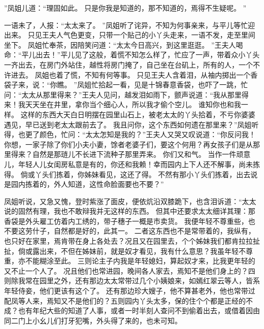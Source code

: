 ”凤姐儿道：“理固如此。
只是你我是知道的，那不知道的，焉得不生疑呢。
”\par
一语未了，人报：“太太来了。
”凤姐听了诧异，不知为何事亲来，与平儿等忙迎出来。
只见王夫人气色更变，只带一个贴己的小丫头走来，一语不发，走至里间坐下。
凤姐忙奉茶，因陪笑问道：“太太今日高兴，到这里逛逛。
”王夫人喝命：“平儿出去！”平儿见了这般，着慌不知怎么样了，忙应了一声，带着众小丫头一齐出去，在房门外站住，越性将房门掩了，自己坐在台矶上，所有的人，一个不许进去。
凤姐也着了慌，不知有何等事。
只见王夫人含着泪，从袖内掷出一个香袋子来，说：“你瞧。
”凤姐忙拾起一看，见是十锦春意香袋，也吓了一跳，忙问：“太太从那里得来？”王夫人见问，越发泪如雨下，颤声说道：“我从那里得来！我天天坐在井里，拿你当个细心人，所以我才偷个空儿。
谁知你也和我一样。
这样的东西大天白日明摆在园里山石上，被老太太的丫头拾着，不亏你婆婆遇见，早已送到老太太跟前去了。
我且问你，这个东西如何遗在那里来？”凤姐听得，也更了颜色，忙问：“太太怎知是我的？”王夫人又哭又叹说道：“你反问我！你想，一家子除了你们小夫小妻，馀者老婆子们，要这个何用？再女孩子们是从那里得来？自然是那琏儿不长进下流种子那里弄来。
你们又和气。
当作一件顽意儿，年轻人儿女闺房私意是有的，你还和我赖！幸而园内上下人还不解事，尚未拣得。
倘或丫头们拣着，你姊妹看见，这还了得。
不然有那小丫头们拣着，出去说是园内拣着的，外人知道，这性命脸面要也不要？”\par
凤姐听说，又急又愧，登时紫涨了面皮，便依炕沿双膝跪下，也含泪诉道：“太太说的固然有理，我也不敢辩我并无这样的东西。
但其中还要求太太细详其理：那香袋是外头雇工仿着内工绣的，带子穗子一概是市卖货。
我便年轻不尊重些，也不要这劳什子，自然都是好的，此其一。
二者这东西也不是常带着的，我纵有，也只好在家里，焉肯带在身上各处去？况且又在园里去，个个姊妹我们都肯拉拉扯扯，倘或露出来，不但在姊妹前，就是奴才看见，我有什么意思？我虽年轻不尊重，亦不能糊涂至此。
三则论主子内我是年轻媳妇，算起奴才来，比我更年轻的又不止一个人了。
况且他们也常进园，晚间各人家去，焉知不是他们身上的？四则除我常在园里之外，还有那边太太常带过几个小姨娘来，如嫣红翠云等人，皆系年轻侍妾，他们更该有这个了。
还有那边珍大嫂子，他不算甚老外，他也常带过配凤等人来，焉知又不是他们的？五则园内丫头太多，保的住个个都是正经的不成？也有年纪大些的知道了人事，或者一时半刻人查问不到偷着出去，或借着因由同二门上小幺儿们打牙犯嘴，外头得了来的，也未可知。
